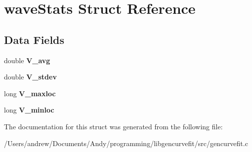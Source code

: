 \hypertarget{structwave_stats}{
\section{waveStats Struct Reference}
\label{structwave_stats}
}
\subsection*{Data Fields}
\begin{DoxyCompactItemize}
\item 
\hypertarget{structwave_stats_a1483f5d550acf27e9238a32a79148e43}{
double {\bfseries V\_\-avg}}
\label{structwave_stats_a1483f5d550acf27e9238a32a79148e43}

\item 
\hypertarget{structwave_stats_aefaa87e12c5287c37e8aecb2fbbe6008}{
double {\bfseries V\_\-stdev}}
\label{structwave_stats_aefaa87e12c5287c37e8aecb2fbbe6008}

\item 
\hypertarget{structwave_stats_af79df368c38db5b9a334592f071ca04f}{
long {\bfseries V\_\-maxloc}}
\label{structwave_stats_af79df368c38db5b9a334592f071ca04f}

\item 
\hypertarget{structwave_stats_a8ec63b10ea48532cb37d3217d49713ed}{
long {\bfseries V\_\-minloc}}
\label{structwave_stats_a8ec63b10ea48532cb37d3217d49713ed}

\end{DoxyCompactItemize}


The documentation for this struct was generated from the following file:\begin{DoxyCompactItemize}
\item 
/Users/andrew/Documents/Andy/programming/libgencurvefit/src/gencurvefit.c\end{DoxyCompactItemize}
